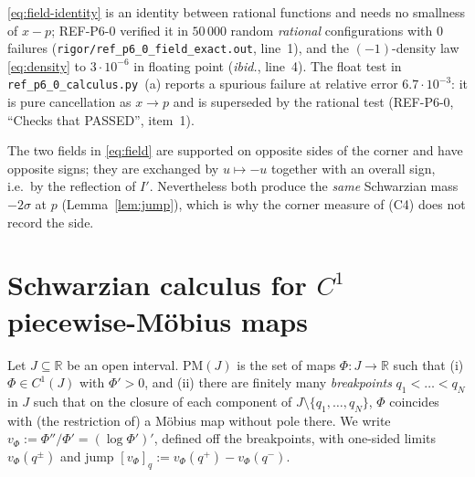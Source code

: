 \documentclass[11pt]{article}
\theoremstyle{definition}\newtheorem{example}[theorem]{Example}
\begin{document}
\begin{remark}\label{rem:field-num}
\eqref{eq:field-identity} is an identity between rational functions and needs no smallness of
$x-p$; REF-P6-0 verified it in $50\,000$ random \emph{rational} configurations with $0$ failures
(\texttt{rigor/ref\_p6\_0\_field\_exact.out}, line~1), and the $(-1)$-density law
\eqref{eq:density} to $3\cdot10^{-6}$ in floating point (\emph{ibid.}, line~4).  The float test in
\texttt{ref\_p6\_0\_calculus.py}~(a) reports a spurious failure at relative error
$6.7\cdot10^{-3}$: it is pure cancellation as $x\to p$ and is superseded by the rational test
(REF-P6-0, ``Checks that PASSED'', item~1).
\end{remark}

\begin{remark}\label{rem:signs}
The two fields in \eqref{eq:field} are supported on opposite sides of the corner and have
opposite signs; they are exchanged by $u\mapsto-u$ together with an overall sign, i.e.\ by the
reflection of $I'$.  Nevertheless both produce the \emph{same} Schwarzian mass $-2\sigma$ at $p$
(Lemma~\ref{lem:jump}), which is why the corner measure of (C4) does not record the side.
\end{remark}

\section{Schwarzian calculus for $C^1$ piecewise-M\"obius maps}\label{sec:schwarz}

\begin{definition}\label{def:PM}
Let $J\subseteq\mathbb R$ be an open interval.  $\mathrm{PM}(J)$ is the set of maps
$\Phi:J\to\mathbb R$ such that (i) $\Phi\in C^1(J)$ with $\Phi'>0$, and (ii) there are finitely
many \emph{breakpoints} $q_1<\dots<q_N$ in $J$ such that on the closure of each component of
$J\setminus\{q_1,\dots,q_N\}$, $\Phi$ coincides with (the restriction of) a M\"obius map without
pole there.  We write $v_\Phi:=\Phi''/\Phi'=(\log\Phi')'$, defined off the breakpoints, with
one-sided limits $v_\Phi(q^\pm)$ and jump $[v_\Phi]_q:=v_\Phi(q^+)-v_\Phi(q^-)$.
\end{definition}
\end{document}
